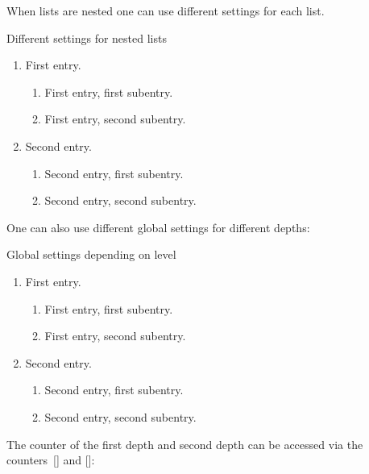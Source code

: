 When lists are nested one can use different settings for each list.
\begin{showlatex}{Different settings for nested lists}
\begin{enumerate}[label = \Roman*)]
  \item
    First entry.
    \begin{enumerate}[label = \alph*)]
      \item
        First entry, first subentry.
      \item
        First entry, second subentry.
    \end{enumerate}
  \item
    Second entry.
    \begin{enumerate}[label = \arabic*)]
      \item
        Second entry, first subentry.
      \item
        Second entry, second subentry.
    \end{enumerate}
\end{enumerate}
\end{showlatex}
One can also use different global settings for different depths:
\begin{showlatex}{Global settings depending on level}
\begin{enumerate}
  \item
    First entry.
    \begin{enumerate}
      \item
        First entry, first subentry.
      \item
        First entry, second subentry.
    \end{enumerate}
  \item
    Second entry.
    \begin{enumerate}
      \item
        Second entry, first subentry.
      \item
        Second entry, second subentry.
    \end{enumerate}
\end{enumerate}
\end{showlatex}
The counter of the first depth and second depth can be accessed via the counters~[\inlinecode] and [\inlinecode]: 
